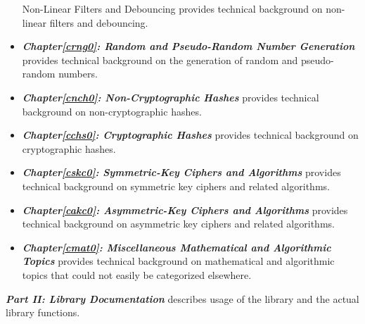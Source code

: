 \begin{itemize}
{{      Non-Linear Filters and Debouncing}} provides technical background on 
      non-linear filters and debouncing.  
\item \emph{\textbf{Chapter\postchapterwordnonstretchable{}\ref{crng0}: 
      Random and Pseudo-Random Number Generation}} provides technical background 
      on the generation of random and pseudo-random numbers.  
\item \emph{\textbf{Chapter\postchapterwordnonstretchable{}\ref{cnch0}: 
      Non-Cryptographic Hashes}} provides technical background on 
      non-cryptographic hashes.  
\item \emph{\textbf{Chapter\postchapterwordnonstretchable{}\ref{cchs0}: 
      Cryptographic Hashes}} provides technical background on cryptographic 
      hashes.  
\item \emph{\textbf{Chapter\postchapterwordnonstretchable{}\ref{cskc0}: 
      Symmetric-Key Ciphers and Algorithms}} provides technical background on 
      symmetric key ciphers and related algorithms.  
\item \emph{\textbf{Chapter\postchapterwordnonstretchable{}\ref{cakc0}: 
      Asymmetric-Key Ciphers and Algorithms}} provides technical background on 
      asymmetric key ciphers and related algorithms.  
\item \emph{\textbf{Chapter\postchapterwordnonstretchable{}\ref{cmat0}: 
      Miscellaneous Mathematical and Algorithmic Topics}} provides technical 
      background on mathematical and algorithmic topics that could not easily be 
      categorized elsewhere.  
\end{itemize}

\emph{\textbf{Part II: Library Documentation}} describes
usage of the library and the actual library functions.

